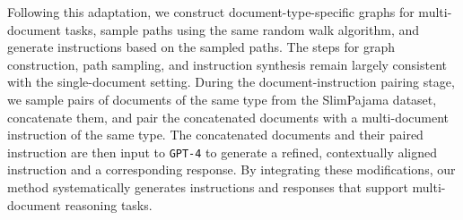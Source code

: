Following this adaptation, we construct document-type-specific graphs for multi-document tasks, sample paths using the same random walk algorithm, and generate instructions based on the sampled paths. The steps for graph construction, path sampling, and instruction synthesis remain largely consistent with the single-document setting.
During the document-instruction pairing stage, we sample pairs of documents of the same type from the SlimPajama dataset, concatenate them, and pair the concatenated documents with a multi-document instruction of the same type.
The concatenated documents and their paired instruction are then input to {\tt GPT-4} to generate a refined, contextually aligned instruction and a corresponding response.
By integrating these modifications, our method systematically generates instructions and responses that support multi-document reasoning tasks.



